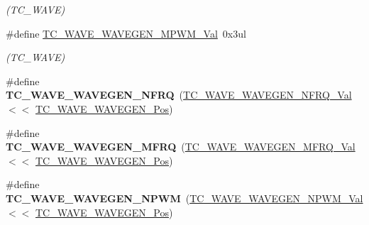 \begin{DoxyCompactItemize}
\begin{DoxyCompactList}\small\item\em (T\+C\+\_\+\+W\+A\+V\+E) \end{DoxyCompactList}\item 
\hypertarget{group___s_a_m_l21___t_c_ga2d4ea75e30a84486be5cd5b49322b652}{}\#define \hyperlink{group___s_a_m_l21___t_c_ga2d4ea75e30a84486be5cd5b49322b652}{T\+C\+\_\+\+W\+A\+V\+E\+\_\+\+W\+A\+V\+E\+G\+E\+N\+\_\+\+M\+P\+W\+M\+\_\+\+Val}~0x3ul\label{group___s_a_m_l21___t_c_ga2d4ea75e30a84486be5cd5b49322b652}

\begin{DoxyCompactList}\small\item\em (T\+C\+\_\+\+W\+A\+V\+E) \end{DoxyCompactList}\item 
\hypertarget{group___s_a_m_l21___t_c_ga76ead3331f9dec70b74555670bd6979f}{}\#define {\bfseries T\+C\+\_\+\+W\+A\+V\+E\+\_\+\+W\+A\+V\+E\+G\+E\+N\+\_\+\+N\+F\+R\+Q}~(\hyperlink{group___s_a_m_l21___t_c_ga13333a2a95c5eceba156466d88f707f4}{T\+C\+\_\+\+W\+A\+V\+E\+\_\+\+W\+A\+V\+E\+G\+E\+N\+\_\+\+N\+F\+R\+Q\+\_\+\+Val}      $<$$<$ \hyperlink{group___s_a_m_l21___t_c_gabc51dddbbf88d5c313cb3ec2f41ce8d4}{T\+C\+\_\+\+W\+A\+V\+E\+\_\+\+W\+A\+V\+E\+G\+E\+N\+\_\+\+Pos})\label{group___s_a_m_l21___t_c_ga76ead3331f9dec70b74555670bd6979f}

\item 
\hypertarget{group___s_a_m_l21___t_c_gaacb9456bdc337131c52012975644b1d1}{}\#define {\bfseries T\+C\+\_\+\+W\+A\+V\+E\+\_\+\+W\+A\+V\+E\+G\+E\+N\+\_\+\+M\+F\+R\+Q}~(\hyperlink{group___s_a_m_l21___t_c_ga4ba086af52ba6f2dce795673307765f8}{T\+C\+\_\+\+W\+A\+V\+E\+\_\+\+W\+A\+V\+E\+G\+E\+N\+\_\+\+M\+F\+R\+Q\+\_\+\+Val}      $<$$<$ \hyperlink{group___s_a_m_l21___t_c_gabc51dddbbf88d5c313cb3ec2f41ce8d4}{T\+C\+\_\+\+W\+A\+V\+E\+\_\+\+W\+A\+V\+E\+G\+E\+N\+\_\+\+Pos})\label{group___s_a_m_l21___t_c_gaacb9456bdc337131c52012975644b1d1}

\item 
\hypertarget{group___s_a_m_l21___t_c_gabcf16c4bd88cfd16a0b975a2c511a69e}{}\#define {\bfseries T\+C\+\_\+\+W\+A\+V\+E\+\_\+\+W\+A\+V\+E\+G\+E\+N\+\_\+\+N\+P\+W\+M}~(\hyperlink{group___s_a_m_l21___t_c_ga5f58535293d3fe1b20c65403df600dca}{T\+C\+\_\+\+W\+A\+V\+E\+\_\+\+W\+A\+V\+E\+G\+E\+N\+\_\+\+N\+P\+W\+M\+\_\+\+Val}      $<$$<$ \hyperlink{group___s_a_m_l21___t_c_gabc51dddbbf88d5c313cb3ec2f41ce8d4}{T\+C\+\_\+\+W\+A\+V\+E\+\_\+\+W\+A\+V\+E\+G\+E\+N\+\_\+\+Pos})\label{group___s_a_m_l21___t_c_gabcf16c4bd88cfd16a0b975a2c511a69e}


\end{DoxyCompactItemize}
